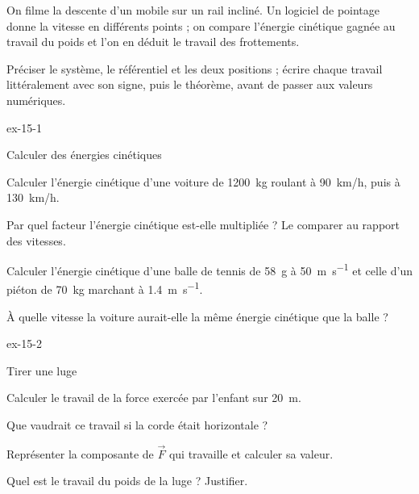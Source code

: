 \begin{experience}
On filme la descente d'un mobile sur un rail incliné. Un logiciel de pointage donne la vitesse en différents points ; on compare
l'énergie cinétique gagnée au travail du poids et l'on en déduit le travail des frottements.
\end{experience}
\begin{rediger}
Préciser le système, le référentiel et les deux positions ; écrire chaque travail littéralement avec son signe, puis le théorème,
avant de passer aux valeurs numériques.
\end{rediger}
\exercices

\begin{blocLivre}{ex-15-1}
\begin{exercice}[1]{Calculer des énergies cinétiques}
\begin{questions}
\item Calculer l'énergie cinétique d'une voiture de \qty{1200}{kg} roulant à \qty{90}{km/h}, puis à \qty{130}{km/h}.
\item Par quel facteur l'énergie cinétique est-elle multipliée ? Le comparer au rapport des vitesses.
\item Calculer l'énergie cinétique d'une balle de tennis de \qty{58}{g} à \qty{50}{m.s^{-1}} et celle d'un piéton de \qty{70}{kg} marchant à \qty{1,4}{m.s^{-1}}.
\item À quelle vitesse la voiture aurait-elle la même énergie cinétique que la balle ?
\end{questions}
\end{exercice}
\end{blocLivre}
\begin{blocLivre}{ex-15-2}
\begin{exercice}[1]{Tirer une luge}
\begin{questions}
\item Calculer le travail de la force exercée par l'enfant sur \qty{20}{m}.
\item Que vaudrait ce travail si la corde était horizontale ?
\item Représenter la composante de $\vec{F}$ qui travaille et calculer sa valeur.
\item Quel est le travail du poids de la luge ? Justifier.
\end{questions}
\end{exercice}
\end{blocLivre}

